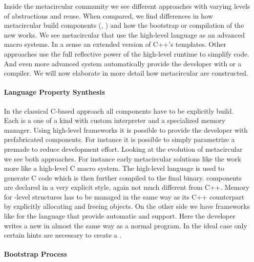 Inside the metacircular \VM community we see different approaches with varying levels of abstractions and reuse.
When compared, we find differences in how metacircular \VMs build \VM components (\GC, \JIT) and how the bootstrap or compilation of the new \VM works.
We see metacircular \VMs that use the high-level language as an advanced macro systems.
In a sense an extended version of C++'s templates.
Other approaches use the full reflective power of the high-level runtime to simplify code.
And even more advanced system automatically provide the \VM developer with \GC or a \JIT compiler.
We will now elaborate in more detail how metacircular \VMs are constructed.


\paragraph{Language Property Synthesis}
In the classical C-based \VM approach all \VM components have to be explicitly build.
Each \VM is a one of a kind with custom interpreter and a specialized memory manager.
Using high-level \VM frameworks it is possible to provide the \VM developer with prefabricated components.
For instance it is possible to simply parametrize a premade \GC to reduce development effort.
Looking at the evolution of metacircular \VMs we see both approaches.
For instance early metacircular solutions like the \Squeak \VM \cite{??} work more like a high-level C macro system.
The high-level language is used to generate C code which is then further compiled to the final \VM binary.
\VM components are declared in a very explicit style, again not much different from C++.
Memory for \VM-level structures has to be managed in the same way as its C++ counterpart by explicitly allocating and freeing objects.
On the other side we have \VM frameworks like \PyPy for the \Python language that provide automatic \GC and \JIT support.
Here the developer writes a new \VM in almost the same way as a normal \Python program.
In the ideal case only certain hints are necessary to create a \JIT.


\paragraph{Bootstrap Process}
\\
 \\
 \\


